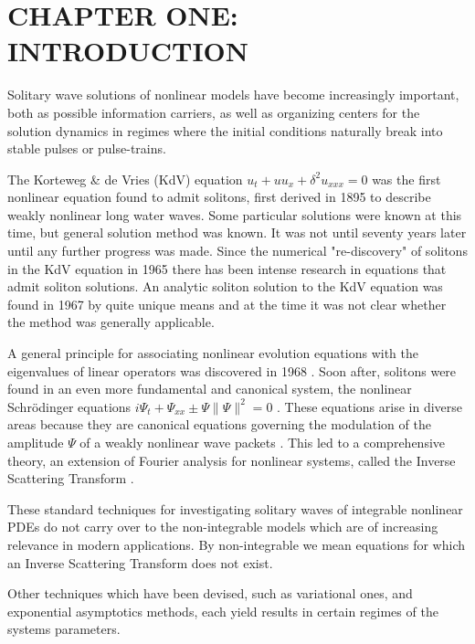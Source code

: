 \chapter{CHAPTER ONE: INTRODUCTION} \label{chapter_1}

Solitary wave solutions of nonlinear models have become increasingly
important, both as possible information carriers,
as well as organizing centers for the solution dynamics in regimes
where the initial conditions naturally break into stable pulses or
pulse-trains.

The Korteweg \& de Vries (KdV) equation $ u_t + u u_x + \delta^2 u_{xxx} = 0$
\cite{KdV}
was the first nonlinear equation found to admit solitons, first derived in 1895
to describe weakly nonlinear long water waves. Some particular solutions were
known at this time, but general solution method was known.  It was not until
seventy years later until any further progress was made.  Since the numerical
"re-discovery" of solitons in the KdV equation \cite{ZK} in 1965 there has been
intense research in equations that admit soliton solutions.  An analytic soliton
solution to the KdV equation was found in 1967 \cite{GGKM} by quite unique means
and at the time it was not clear whether the method was generally applicable.

A general principle for associating nonlinear evolution equations with the
eigenvalues of linear operators was discovered in 1968 \cite{Lax}.  Soon after,
solitons were found in an even more fundamental and canonical system, the
nonlinear Schr\"odinger equations $ i \Psi_t + \Psi_{xx} \pm \Psi\|\Psi\|^2 = 0
$ \cite{ZS}. These equations arise in diverse areas because they are canonical
equations governing the modulation of the amplitude $\Psi$ of a weakly nonlinear
wave packets \cite{DJ}.  This led to a comprehensive theory, an extension of
Fourier analysis for nonlinear systems, called the Inverse Scattering Transform
\cite{AKNS}.

These standard techniques for investigating solitary waves of integrable
nonlinear PDEs do not carry over to the non-integrable models which are of
increasing relevance in modern applications. By non-integrable we mean equations
for which an Inverse Scattering Transform does not exist.

Other techniques which have been devised, such as variational ones, and
exponential asymptotics methods, each yield results in certain regimes of the
systems parameters.

